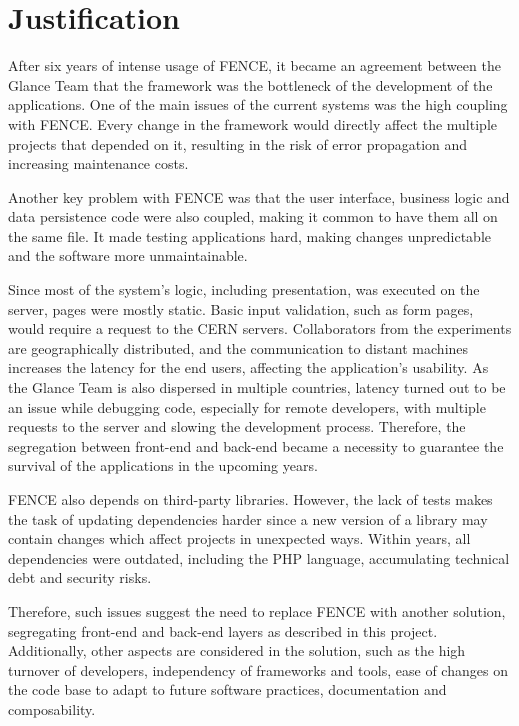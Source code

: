 \section{Justification}

After six years of intense usage of FENCE, it became an agreement between the Glance Team that the framework was the bottleneck of the development of the applications. One of the main issues of the current systems was the high coupling with FENCE. Every change in the framework would directly affect the multiple projects that depended on it, resulting in the risk of error propagation and increasing maintenance costs.

Another key problem with FENCE was that the user interface, business logic and data persistence code were also coupled, making it common to have them all on the same file. It made testing applications hard, making changes unpredictable and the software more unmaintainable.

Since most of the system's logic, including presentation, was executed on the server, pages were mostly static. Basic input validation, such as form pages, would require a request to the CERN servers. Collaborators from the experiments are geographically distributed, and the communication to distant machines increases the latency for the end users, affecting the application's usability. As the Glance Team is also dispersed in multiple countries, latency turned out to be an issue while debugging code, especially for remote developers, with multiple requests to the server and slowing the development process. Therefore, the segregation between front-end and back-end became a necessity to guarantee the survival of the applications in the upcoming years.

FENCE also depends on third-party libraries. However, the lack of tests makes the task of updating dependencies harder since a new version of a library may contain changes which affect projects in unexpected ways. Within years, all dependencies were outdated, including the PHP language, accumulating technical debt and security risks.

Therefore, such issues suggest the need to replace FENCE with another solution, segregating front-end and back-end layers as described in this project. Additionally, other aspects are considered in the solution, such as the high turnover of developers, independency of frameworks and tools, ease of changes on the code base to adapt to future software practices, documentation and composability.


